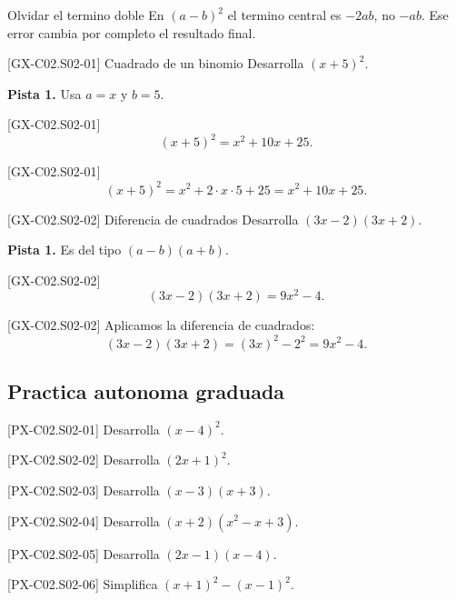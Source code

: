\begin{commonerror}{Olvidar el termino doble}
En \((a-b)^2\) el termino central es \(-2ab\), no \(-ab\). Ese error cambia por completo el
resultado final.
\end{commonerror}

\begin{guidedexercise}{[GX-C02.S02-01] Cuadrado de un binomio}
Desarrolla \((x+5)^2\).

\textbf{Pista 1.} Usa \(a=x\) y \(b=5\).
\end{guidedexercise}

\begin{shortanswer}{[GX-C02.S02-01]}
\[
(x+5)^2=x^2+10x+25.
\]
\end{shortanswer}

\begin{fullsolution}{[GX-C02.S02-01]}
\[
(x+5)^2=x^2+2\cdot x\cdot 5+25=x^2+10x+25.
\]
\end{fullsolution}

\begin{guidedexercise}{[GX-C02.S02-02] Diferencia de cuadrados}
Desarrolla \((3x-2)(3x+2)\).

\textbf{Pista 1.} Es del tipo \((a-b)(a+b)\).
\end{guidedexercise}

\begin{shortanswer}{[GX-C02.S02-02]}
\[
(3x-2)(3x+2)=9x^2-4.
\]
\end{shortanswer}

\begin{fullsolution}{[GX-C02.S02-02]}
Aplicamos la diferencia de cuadrados:
\[
(3x-2)(3x+2)=(3x)^2-2^2=9x^2-4.
\]
\end{fullsolution}

\subsection*{Practica autonoma graduada}
\begin{exercise}{[PX-C02.S02-01] Desarrolla \((x-4)^2\).}
\end{exercise}
\begin{exercise}{[PX-C02.S02-02] Desarrolla \((2x+1)^2\).}
\end{exercise}
\begin{exercise}{[PX-C02.S02-03] Desarrolla \((x-3)(x+3)\).}
\end{exercise}
\begin{exercise}{[PX-C02.S02-04] Desarrolla \((x+2)(x^2-x+3)\).}
\end{exercise}
\begin{exercise}{[PX-C02.S02-05] Desarrolla \((2x-1)(x-4)\).}
\end{exercise}
\begin{exercise}{[PX-C02.S02-06] Simplifica \((x+1)^2-(x-1)^2\).}
\end{exercise}

